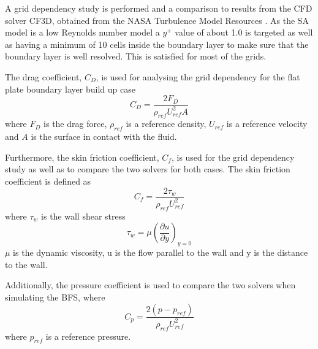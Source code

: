 A grid dependency study is performed and a comparison to results from the CFD solver CF3D, obtained from the NASA Turbulence Model Resources \cite{NASA}. As the SA model is a low Reynolds number model a $y^+$ value of about 1.0 is targeted as well as having a minimum of 10 cells inside the boundary layer to make sure that the boundary layer is well resolved. This is satisfied for most of the grids. 

The drag coefficient, $C_D$, is used for analysing the grid dependency for the flat plate boundary layer build up case
\begin{equation}
C_D=\frac{2F_D}{\rho_{ref}U^2_{ref}A}
\label{eq:CD}
\end{equation}
where $F_D$ is the drag force, $\rho_{ref}$ is a reference density, $U_{ref}$ is a reference velocity and $A$ is the surface in contact with the fluid.

Furthermore, the skin friction coefficient, $C_f$, is used for the grid dependency study as well as to compare the two solvers for both cases. The skin friction coefficient is defined as
\begin{equation}
  C_f = \frac{2\tau _w}{\rho_{ref}U^2_{ref}}
  \label{eq:CF}
\end{equation}
where $\tau _w$ is the wall shear stress
\begin{equation*}
  \tau_w = \mu \left( \frac{\partial u}{\partial y}\right)_{y=0}
\end{equation*}
$\mu$ is the dynamic viscosity, u is the flow parallel to the wall and y is the distance to the wall.

Additionally, the pressure coefficient is used to compare the two solvers when simulating the BFS, where
\begin{equation}
  C_p = \frac{2(p-p_{ref})}{\rho_{ref}U^2_{ref}}
  \label{eq:CP}
\end{equation}
where $p_{ref}$ is a reference pressure. 
